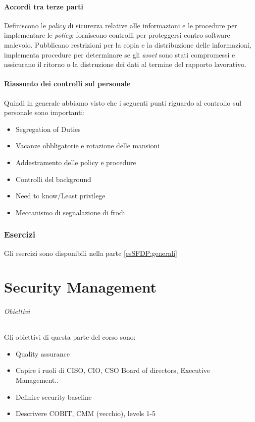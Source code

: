 \subsection{Accordi tra terze parti}

Definiscono le \textit{policy} di sicurezza relative alle informazioni e le 
procedure per implementare le \textit{policy}; forniscono controlli per 
proteggersi contro software malevolo. Pubblicano restrizioni per la copia e la 
distribuzione delle informazioni, implementa procedure per determinare se gli 
\textit{asset} sono stati compromessi e assicurano il ritorno o la distruzione 
dei dati al termine del rapporto lavorativo.

\subsection{Riassunto dei controlli sul personale}

Quindi in generale abbiamo visto che i seguenti punti riguardo al controllo sul 
personale sono importanti:
\begin{itemize}
\item Segregation of Duties
\item Vacanze obbligatorie e rotazione delle mansioni
\item Addestramento delle policy e procedure
\item Controlli del background
\item Need to know/Least privilege
\item Meccanismo di segnalazione di frodi 
\end{itemize}

\section{Esercizi}

Gli esercizi sono disponibili nella parte \ref{esSFDP:generali}

\part{Security Management}

\paragraph{Obiettivi}

Gli obiettivi di questa parte del corso sono:
\begin{itemize}
\item Quality assurance
\item Capire i ruoli di CISO, CIO, CSO Board of directors, Executive 
Management..
\item Definire security baseline 
\item Descrivere COBIT, CMM (vecchio), levels 1-5
\end{itemize}

